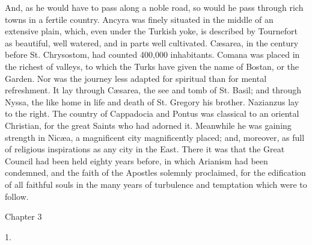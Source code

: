 And, as he would have to pass along a noble road, so would he pass
through rich towns in a fertile country. Ancyra was finely situated in
the middle of an extensive plain, which, even under the Turkish yoke,
is described by Tournefort as beautiful, well watered, and in parts
well cultivated. Cæsarea, in the century before St. Chrysostom, had
counted 400,000 inhabitants. Comana was placed in the richest of
valleys, to which the Turks have given the name of Bostan, or the
Garden. Nor was the journey less adapted for spiritual than for mental
refreshment. It lay through Cæsarea, the see and tomb of St. Basil;
and through Nyssa, the like home in life and death of St. Gregory his
brother. Nazianzus lay to the right. The country of Cappadocia and
Pontus was classical to an oriental Christian, for the great Saints
who had adorned it. Meanwhile he was gaining strength in Nicæa, a
magnificent city magnificently placed; and, moreover, as full of
religious inspirations as any city in the East. There it was
that the Great Council had been held eighty years before, in which
Arianism had been condemned, and the faith of the Apostles solemnly
proclaimed, for the edification of all faithful souls in the many
years of turbulence and temptation which were to follow.

Chapter 3


1.


